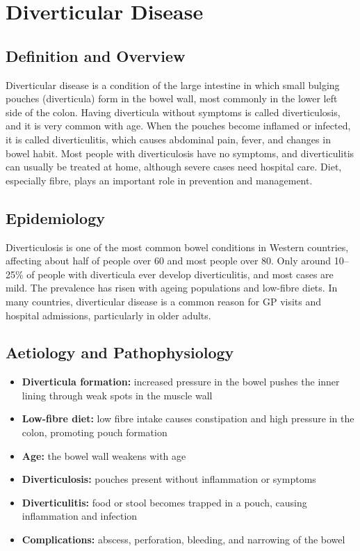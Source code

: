 \chapter{Diverticular Disease}

\section*{Definition and Overview}
Diverticular disease is a condition of the large intestine in which small bulging pouches (diverticula) form in the bowel wall, most commonly in the lower left side of the colon. Having diverticula without symptoms is called diverticulosis, and it is very common with age. When the pouches become inflamed or infected, it is called diverticulitis, which causes abdominal pain, fever, and changes in bowel habit. Most people with diverticulosis have no symptoms, and diverticulitis can usually be treated at home, although severe cases need hospital care. Diet, especially fibre, plays an important role in prevention and management.

\section*{Epidemiology}
Diverticulosis is one of the most common bowel conditions in Western countries, affecting about half of people over 60 and most people over 80. Only around 10--25\% of people with diverticula ever develop diverticulitis, and most cases are mild. The prevalence has risen with ageing populations and low-fibre diets. In many countries, diverticular disease is a common reason for GP visits and hospital admissions, particularly in older adults.

\section*{Aetiology and Pathophysiology}
\begin{itemize}
    \item \textbf{Diverticula formation:} increased pressure in the bowel pushes the inner lining through weak spots in the muscle wall
    \item \textbf{Low-fibre diet:} low fibre intake causes constipation and high pressure in the colon, promoting pouch formation
    \item \textbf{Age:} the bowel wall weakens with age
    \item \textbf{Diverticulosis:} pouches present without inflammation or symptoms
    \item \textbf{Diverticulitis:} food or stool becomes trapped in a pouch, causing inflammation and infection
    \item \textbf{Complications:} abscess, perforation, bleeding, and narrowing of the bowel
\end{itemize}

